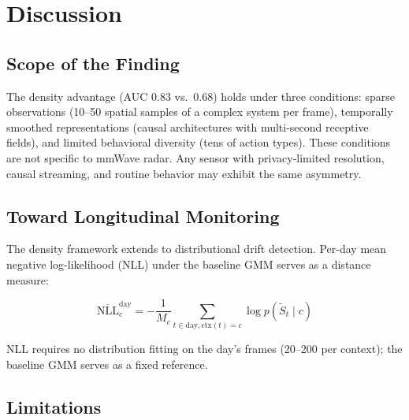 \documentclass[11pt,a4paper]{article}
\begin{document}
\section{Discussion}

\subsection{Scope of the Finding}

The density advantage (AUC 0.83 vs.\ 0.68) holds under three conditions: sparse observations (10--50 spatial samples of a complex system per frame), temporally smoothed representations (causal architectures with multi-second receptive fields), and limited behavioral diversity (tens of action types).
These conditions are not specific to mmWave radar. Any sensor with privacy-limited resolution, causal streaming, and routine behavior may exhibit the same asymmetry.

\subsection{Toward Longitudinal Monitoring}

The density framework extends to distributional drift detection.
Per-day mean negative log-likelihood (NLL) under the baseline GMM serves as a distance measure:

\begin{equation}
\overline{\text{NLL}}_c^{\text{day}} = -\frac{1}{M_c}\sum_{t \in \text{day}, \text{ctx}(t)=c} \log p(\tilde{S}_t \mid c)
\end{equation}

NLL requires no distribution fitting on the day's frames (20--200 per context); the baseline GMM serves as a fixed reference.

\subsection{Limitations}
\end{document}
